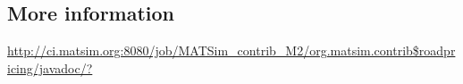 \subsection{More information}

\url{http://ci.matsim.org:8080/job/MATSim_contrib_M2/org.matsim.contrib$roadpricing/javadoc/?}


